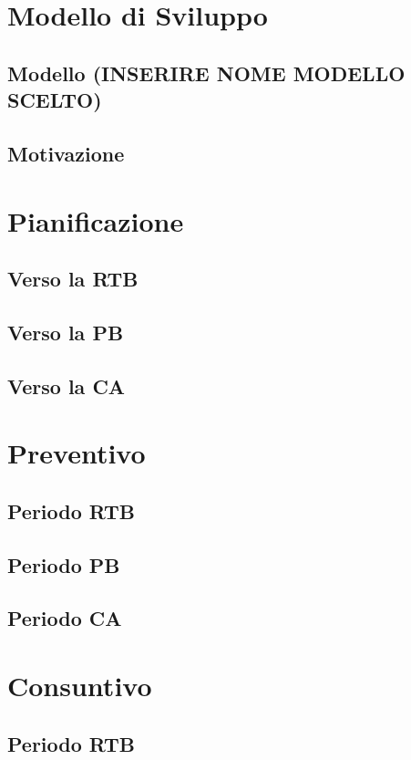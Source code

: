 \documentclass[5pt]{article}
\begin{document}
\section{Modello di Sviluppo}
\subsection{Modello (INSERIRE NOME MODELLO SCELTO)}
\subsection{Motivazione}

\section{Pianificazione}
\subsection{Verso la RTB}
\subsection{Verso la PB}
\subsection{Verso la CA}

\section{Preventivo}
\subsection{Periodo RTB}
\subsection{Periodo PB}
\subsection{Periodo CA}

\section{Consuntivo}
\subsection{Periodo RTB}
\end{document}
